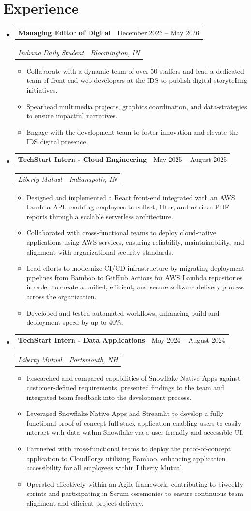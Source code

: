 \documentclass[letterpaper,11pt]{article}
\makeatletter
\newcommand{\resumeItem}[1]{
  \item\small{
    {#1 \vspace{-2pt}}
  }
}
\newcommand{\flexText}[2]{
  \begin{tabular*}{1.0\textwidth}[t]{l@{\extracolsep{\fill}}r}
    #1 & #2 \\
  \end{tabular*}
}
\newcommand{\resumeSubheading}[4]{
  \vspace{-2pt}\item
  \flexText{#1}{#2}
  \flexText{\textit{\small #3}}{\textit{\small #4}}
}
\newcommand{\resumeSubHeadingListStart}{\begin{itemize}[leftmargin=0in, label={}]}
\newcommand{\resumeSubHeadingListEnd}{\end{itemize}\vspace{-9pt}}
\newcommand{\resumeItemListStart}{\vspace{-2pt}\begin{itemize}[leftmargin=0.3in]}
\newcommand{\resumeItemListEnd}{\end{itemize}\vspace{-5pt}}
\makeatother
\begin{document}
\section{Experience}
\resumeSubHeadingListStart
\resumeSubheading
{\textbf{Managing Editor of Digital}}{December 2023 -- May 2026}
{Indiana Daily Student}{Bloomington, IN}
\vspace{-19pt}
{\small \resumeItemListStart
\resumeItem{Collaborate with a dynamic team of over 50 staffers and lead a dedicated  team of front-end web developers at the IDS to publish digital storytelling  initiatives.}
\resumeItem{Spearhead multimedia projects, graphics coordination, and data-strategies  to ensure impactful narratives.}
\resumeItem{Engage with the development team to foster innovation and elevate the IDS  digital presence.}
\resumeItemListEnd}
\resumeSubheading
{\textbf{TechStart Intern - Cloud Engineering}}{May 2025 -- August 2025}
{Liberty Mutual}{Indianapolis, IN}
\vspace{-19pt}
{\small \resumeItemListStart
\resumeItem{Designed and implemented a React front-end integrated with an AWS Lambda API,  enabling employees to collect, filter, and retrieve PDF reports through a scalable  serverless architecture.}
\resumeItem{Collaborated with cross-functional teams to deploy cloud-native applications using AWS services, ensuring reliability, maintainability, and alignment with organizational  security standards.}
\resumeItem{Lead efforts to modernize CI/CD infrastructure by migrating deployment pipelines  from Bamboo to GitHub Actions for AWS Lambda repositories in order to create a unified,  efficient, and secure software delivery process across the organization.}
\resumeItem{Developed and tested automated workflows, enhancing build and deployment  speed by up to 40\%.}
\resumeItemListEnd}
\resumeSubheading
{\textbf{TechStart Intern - Data Applications}}{May 2024 -- August 2024}
{Liberty Mutual}{Portsmouth, NH}
\vspace{-19pt}
{\small \resumeItemListStart
\resumeItem{Researched and compared capabilities of Snowflake Native Apps against  customer-defined requirements, presented findings to the team and integrated  team feedback into the development process.}
\resumeItem{Leveraged Snowflake Native Apps and Streamlit to develop a fully functional  proof-of-concept full-stack application enabling users to easily interact with  data within Snowflake via a user-friendly and accessible UI.}
\resumeItem{Partnered with cross-functional teams to deploy the proof-of-concept  application to CloudForge utilizing Bamboo, enhancing application  accessibility for all employees within Liberty Mutual.}
\resumeItem{Operated effectively within an Agile framework, contributing to biweekly  sprints and participating in Scrum ceremonies to ensure continuous team  alignment and efficient project delivery.}
\resumeItemListEnd}
\resumeSubHeadingListEnd
\end{document}

